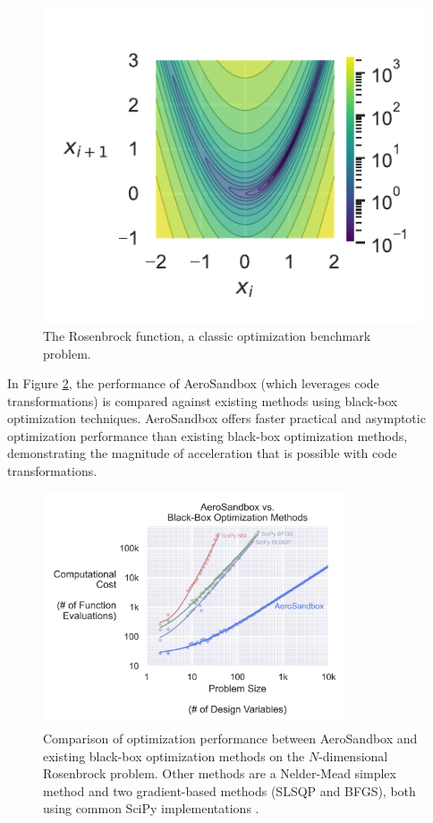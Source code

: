\documentclass[12pt,vi,oneside,table]{report}
\begin{document}
    \begin{figure}[H]
        \centering
        \includegraphics{../figures/rosenbrock_function.pdf}
        \caption{The Rosenbrock function, a classic optimization benchmark problem.}
        \label{fig:rosenbrock}
    \end{figure}

    In Figure \ref{fig:aerosandbox_scaling_comparison}, the performance of AeroSandbox (which leverages code transformations) is compared against existing methods using black-box optimization techniques. AeroSandbox offers faster practical and asymptotic optimization performance than existing black-box optimization methods, demonstrating the magnitude of acceleration that is possible with code transformations.

    \begin{figure}[H]
        \centering
        \includegraphics[width=0.8\textwidth]{../figures/aerosandbox_scaling_comparison.png}
        \caption{Comparison of optimization performance between AeroSandbox and existing black-box optimization methods on the $N$-dimensional Rosenbrock problem. Other methods are a Nelder-Mead simplex method and two gradient-based methods (SLSQP and BFGS), both using common SciPy implementations \cite{scipy}.}
        \label{fig:aerosandbox_scaling_comparison}
    \end{figure}
    
\end{document}
